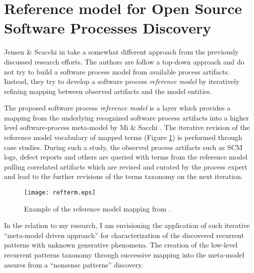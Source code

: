 \section{Reference model for Open Source Software Processes Discovery}
Jensen \& Scacchi in \cite{citeulike:5043664} take a somewhat different approach from the previously discussed research efforts. The authors are follow a top-down approach and do not try to build a software process model from available process artifacts. Instead, they try to develop a software process \textit{reference model} by iteratively refining mapping between observed artifacts and the model entities. 

The proposed software process \textit{reference model} is a layer which provides a mapping from the underlying recognized software process artifacts into a higher level software-process meta-model by Mi \& Sacchi \cite{citeulike:5128872}. The iterative revision of the reference model vocabulary of mapped terms (Figure \ref{fig:refterm}) is performed through case studies. During such a study, the observed process artifacts such as SCM logs, defect reports and others are queried with terms from the reference model pulling correlated artifacts which are revised and curated by the process expert and lead to the further revisions of the terms taxonomy on the next iteration.

\begin{figure}[tbp]
   \centering
   \texttt{[image: refterm.eps]}
   \caption{Example of the reference model mapping from \cite{citeulike:5043664}.}
   \label{fig:refterm}
\end{figure}

In the relation to my research, I am envisioning the application of such iterative ``meta-model driven approach'' for characterization of the discovered recurrent patterns with unknown generative phenomena. The creation of the low-level recurrent patterns taxonomy through successive mapping into the meta-model assures from a ``nonsense patterns'' discovery.